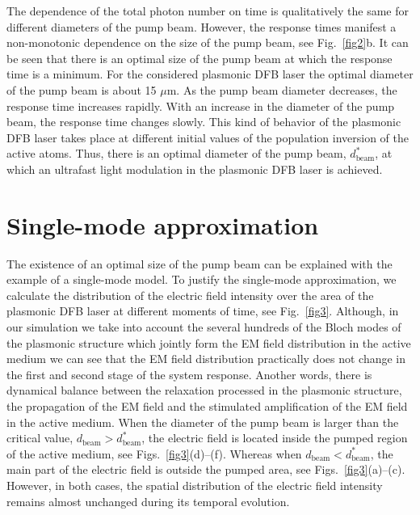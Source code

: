 \documentclass[aps,pra,amsmath,amssymb,onecolumn,superscriptaddress,showpacs,floatfix,]{revtex4-1}
\begin{document}
The dependence of the total photon number on time is qualitatively the same for different diameters of the pump beam.
However, the response times manifest a non-monotonic dependence on the size of the pump beam, see Fig.~\ref{fig2}b.
It can be seen that there is an optimal size of the pump beam at which the response time is a minimum.
For the considered plasmonic DFB laser the optimal diameter of the pump beam is about 15 $\mu$m.
As the pump beam diameter decreases, the response time increases rapidly.
With an increase in the diameter of the pump beam, the response time changes slowly.
This kind of behavior of the plasmonic DFB laser takes place at different initial values of the population inversion of the active atoms.
Thus, there is an optimal diameter of the pump beam, $d_{\text{beam}}^*$, at which an ultrafast light modulation in the plasmonic DFB laser is achieved.

\section*{Single-mode approximation}

The existence of an optimal size of the pump beam can be explained with the example of a single-mode model. To justify the single-mode approximation, we calculate the distribution of the electric field intensity over the area of the plasmonic DFB laser at different moments of time, see Fig.~\ref{fig3}.
Although, in our simulation we take into account the several hundreds of the Bloch modes of the plasmonic structure which jointly form the EM field distribution in the active medium we can see that the EM field distribution practically does not change in the first and second stage of the system response. Another words, there is dynamical balance between the relaxation processed in the plasmonic structure, the propagation of the EM field and the stimulated amplification of the EM field in the active medium. When the diameter of the pump beam is larger than the critical value, $d_{\text{beam}} > d_{\text{beam}}^*$, the electric field is located inside the pumped region of the active medium, see Figs.~\ref{fig3}(d)--(f).
Whereas when $d_{\text{beam}} < d_{\text{beam}}^*$, the main part of the electric field is outside the pumped area, see Figs.~\ref{fig3}(a)--(c).
However, in both cases, the spatial distribution of the electric field intensity remains almost unchanged during its temporal evolution. 
\end{document}
